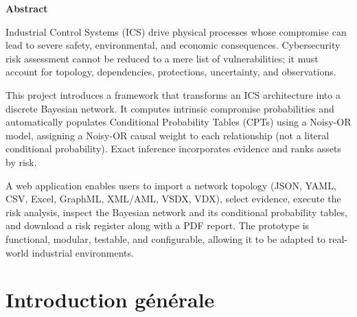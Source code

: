 \documentclass[12pt,a4paper]{article}
\newcommand{\unnumberedsection}[1]{%
  \phantomsection
  {\normalfont\Large\bfseries\sffamily\color{primary}#1\par}
  \vspace{-2pt}{\color{secondary!70}\rule{\linewidth}{0.8pt}}
  \vspace{1.6ex plus 0.2ex}%
}
\newcommand{\forcereset}[1]{%
    \needspace{#1\baselineskip}%
}
\begin{document}
\newpage
\thispagestyle{empty}
\unnumberedsection{Abstract}

\begin{abstractbox}
Industrial Control Systems (ICS) drive physical processes whose compromise can lead to severe safety, environmental, and economic consequences. Cybersecurity risk assessment cannot be reduced to a mere list of vulnerabilities; it must account for topology, dependencies, protections, uncertainty, and observations.

This project introduces a framework that transforms an ICS architecture into a discrete Bayesian network. It computes intrinsic compromise probabilities and automatically populates Conditional Probability Tables (CPTs) using a Noisy-OR model, assigning a Noisy-OR causal weight to each relationship (not a literal conditional probability). Exact inference incorporates evidence and ranks assets by risk.

A web application enables users to import a network topology (JSON, YAML, CSV, Excel, GraphML, XML/AML, VSDX, VDX), select evidence, execute the risk analysis, inspect the Bayesian network and its conditional probability tables, and download a risk register along with a PDF report. The prototype is functional, modular, testable, and configurable, allowing it to be adapted to real-world industrial environments.
\end{abstractbox}

\newpage
\pagestyle{fancy}   %

\tableofcontents
\newpage
\listoffigures
\newpage

\section{Introduction générale}
\forcereset{8}
\end{document}
